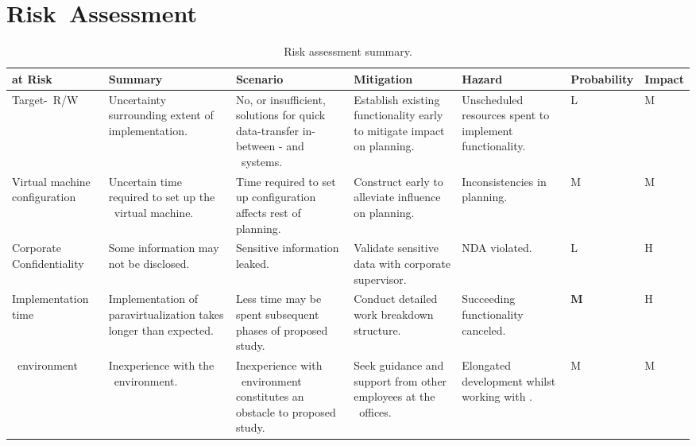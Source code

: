 \section{Risk~Assessment}
\label{sec:risksandliabilities_riskassessment}
\begin{sidewaystable}[h]
\begin{tabular*}{0.75\textwidth}{p{2.8cm}|p{2.8cm}|p{2.8cm}|p{2.8cm}|p{2.8cm}|p{2.2cm}|p{2.2cm}} %
	\textbf{at Risk}				& \textbf{Summary}														& \textbf{Scenario}                   																		& \textbf{Mitigation}        												& \textbf{Hazard}												& \textbf{Probability}	& \textbf{Impact}	\\ \hline
	Target-\termhost\ R/W			& Uncertainty surrounding extent of implementation. 					& No, or insufficient, solutions for quick data-transfer in-between \termhost - and \termtarget\ systems.	& Establish existing functionality early to mitigate impact on planning.	& Unscheduled resources spent to implement functionality.		& L 					& M					\\ \hline
	Virtual machine configuration	& Uncertain time required to set up the \termandroid\ virtual machine. 	& Time required to set up configuration affects rest of planning.											& Construct early to alleviate influence on planning.						& Inconsistencies in planning.									& M 					& M					\\ \hline
	Corporate Confidentiality		& Some information may not be disclosed.								& Sensitive information leaked.																				& Validate sensitive data with corporate supervisor.						& NDA violated. 												& L 					& H					\\ \hline
	Implementation time				& Implementation of paravirtualization takes longer than expected.		& Less time may be spent subsequent phases of proposed study.																& Conduct detailed work breakdown structure.				& Succeeding functionality canceled.	& \textbf{M}			& H					\\ \hline
	\termsimics\ environment		& Inexperience with the \termsimics\ environment.						& Inexperience with \termsimics\ environment constitutes an obstacle to proposed study.						& Seek guidance and support from other employees at the \termintel\ offices. & Elongated development whilst working with \termsimics .		& M						& M					
\end{tabular*}
\label{tab:risks}
\caption{Risk assessment summary.}
\end{sidewaystable}
